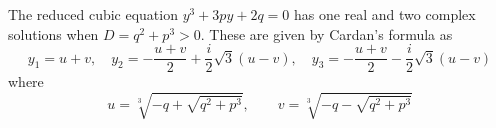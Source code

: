 \documentclass{article}
\begin{document}
The reduced cubic equation $y^3 + 3py +2q = 0$ has one real and two complex
solutions when $D = q^2 + p^3 > 0$. These are given by Cardan's formula as
\[ y_1 = u + v,\quad y_2 = -\frac{u+v}{2} + \frac{i}{2}\sqrt{3}(u - v),\quad
   y_3 = -\frac{u+v}{2} - \frac{i}{2}\sqrt{3}(u-v) \]
where
\[ u = \sqrt[3]{-q + \sqrt{q^2+p^3}},\qquad v = \sqrt[3]{-q - \sqrt{q^2+p^3}} \]
\end{document}
